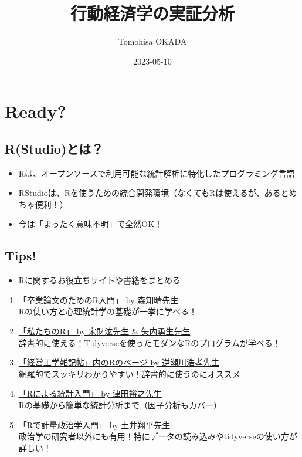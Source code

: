 \documentclass[
]{book}
\title{行動経済学の実証分析}
\author{Tomohisa OKADA}
\date{2023-05-10}
\providecommand{\tightlist}{%
  \setlength{\itemsep}{0pt}\setlength{\parskip}{0pt}}
\begin{document}
\maketitle

{
\setcounter{tocdepth}{1}
\tableofcontents
}
\hypertarget{ready}{%
\chapter{Ready?}\label{ready}}

\hypertarget{rstudioux3068ux306f}{%
\section{R(Studio)とは？}\label{rstudioux3068ux306f}}

\begin{itemize}
\tightlist
\item
  Rは、オープンソースで利用可能な統計解析に特化したプログラミング言語
\item
  RStudioは、Rを使うための統合開発環境（なくてもRは使えるが、あるとめちゃ便利！）\\
\item
  今は「まったく意味不明」で全然OK！
\end{itemize}

\hypertarget{tips}{%
\section{Tips!}\label{tips}}

\begin{itemize}
\tightlist
\item
  Rに関するお役立ちサイトや書籍をまとめる
\end{itemize}

\begin{enumerate}
\def\labelenumi{\arabic{enumi}.}
\item
  \href{https://tomoecon.github.io/R_for_graduate_thesis/}{「卒業論文のためのR入門」 by 森知晴先生}\\
  Rの使い方と心理統計学の基礎が一挙に学べる！
\item
  \href{https://www.jaysong.net/RBook/datahandling1.html}{「私たちのR」 by 宋財泫先生 \& 矢内勇生先生}\\
  辞書的に使える！Tidyverseを使ったモダンなRのプログラムが学べる！
\item
  \href{http://www.f.waseda.jp/sakas/R/index.html}{「経営工学雑記帖」内のRのページ by 逆瀬川浩孝先生}\\
  網羅的でスッキリわかりやすい！辞書的に使うのにオススメ
\item
  \href{https://htsuda.net/stats/}{「Rによる統計入門」 by 津田裕之先生}\\
  Rの基礎から簡単な統計分析まで（因子分析もカバー）
\item
  \href{https://shohei-doi.github.io/quant_polisci/index.html}{「Rで計量政治学入門」 by 土井翔平先生}\\
  政治学の研究者以外にも有用！特にデータの読み込みやtidyverseの使い方が詳しい！
\end{enumerate}
\end{document}
